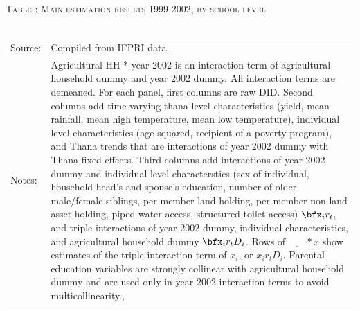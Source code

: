 \begin{table}\hfil\textsc{\footnotesize Table \thetable: Main estimation results 1999-2002, by school level\label{zEm.1999.10.sameN}}\\\setlength{\tabcolsep}{.5pt}\renewcommand{\arraystretch}{.675}\hspace{-2em}\hfil\\\renewcommand{\arraystretch}{1}\hfil\begin{tabular}{>{\hfill\scriptsize}p{1cm}<{}>{\scriptsize}p{12cm}<{\hfill}} Source:& Compiled from IFPRI data. \\[-1ex] Notes:&   \textsf{Agricultural HH * year 2002} is an interaction term of agricultural household dummy and year 2002 dummy. All interaction terms are demeaned. For each panel, first columns are raw DID. Second columns add time-varying thana level characteristics (yield, mean rainfall, mean high temperature, mean low temperature), individual level characteristics (age squared, recipient of a poverty program), and \textsf{Thana trends} that are interactions of year 2002 dummy with Thana fixed effects. Third columns add interactions of year 2002 dummy and individual level characterstics (sex of individual, household head's and spouse's education, number of older male/female siblings, per member land holding, per member non land asset holding, piped water access, structured toilet access) $\bfx_{i}r_{t}$, and triple interactions of year 2002 dummy, individual characteristics, and agricultural household dummy $\bfx_{i}r_{t}D_{i}$. Rows of $\underline{\phantom{mm}}*x$ show estimates of the triple interaction term of $x_{i}$, or $x_{i}r_{t}D_{i}$. Parental education variables are strongly collinear with agricultural household dummy and are used only in year 2002 interaction terms to avoid multicollinearity., \\   \end{tabular} \end{table}


